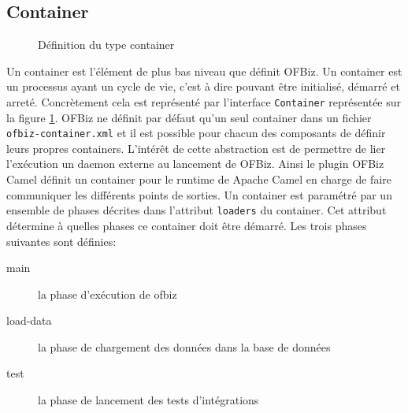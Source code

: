 \documentclass[a4paper, 11pt]{report}
\begin{document}
\subsection{Container}

\begin{figure}
  \centering
  \caption{Définition du type container}
  \label{fig:containertype}
\end{figure}

Un container est l'élément de plus bas niveau que définit OFBiz. Un
container est un processus ayant un cycle de vie, c'est à dire pouvant
être initialisé, démarré et arreté. Concrètement cela est représenté
par l'interface \verb=Container= représentée sur la figure
\ref{fig:containertype}. OFBiz ne définit par défaut qu'un seul
container dans un fichier \verb=ofbiz-container.xml= et il est
possible pour chacun des composants de définir leurs propres
containers. L'intérêt de cette abstraction est de permettre de lier
l'exécution un daemon externe au lancement de OFBiz. Ainsi le plugin
OFBiz Camel définit un container pour le runtime de Apache Camel en
charge de faire communiquer les différents points de sorties. Un
container est paramétré par un ensemble de phases décrites dans
l'attribut \verb=loaders= du container. Cet attribut détermine à
quelles phases ce container doit être démarré. Les trois phases
suivantes sont définies:
\begin{description}
\item[main] la phase d'exécution de ofbiz
\item[load-data] la phase de chargement des données dans la base de
  données
\item[test] la phase de lancement des tests d'intégrations
\end{description}
\end{document}
